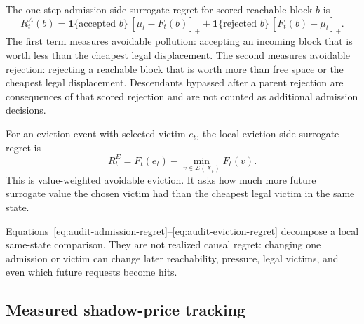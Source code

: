 \documentclass[11pt]{article}
\begin{document}
The one-step admission-side surrogate regret for scored reachable block \(b\) is
\begin{equation}
  R^A_t(b)=
  \mathbf 1\{\text{accepted }b\}\,[\mu_t-F_t(b)]_+
  +
  \mathbf 1\{\text{rejected }b\}\,[F_t(b)-\mu_t]_+.
  \label{eq:audit-admission-regret}
\end{equation}
The first term measures avoidable pollution: accepting an incoming block that is worth
less than the cheapest legal displacement.  The second measures avoidable rejection:
rejecting a reachable block that is worth more than free space or the cheapest legal
displacement.  Descendants bypassed after a parent rejection are consequences of that
scored rejection and are not counted as additional admission decisions.

For an eviction event with selected victim \(e_t\), the local eviction-side surrogate
regret is
\begin{equation}
  R^E_t=
  F_t(e_t)-\min_{v\in\mathcal L(X_t)}F_t(v).
  \label{eq:audit-eviction-regret}
\end{equation}
This is value-weighted avoidable eviction.  It asks how much more future surrogate
value the chosen victim had than the cheapest legal victim in the same state.

Equations~\eqref{eq:audit-admission-regret}--\eqref{eq:audit-eviction-regret} decompose
a local same-state comparison.  They are not realized causal regret: changing one
admission or victim can change later reachability, pressure, legal victims, and even
which future requests become hits.

\subsection{Measured shadow-price tracking}
\end{document}
